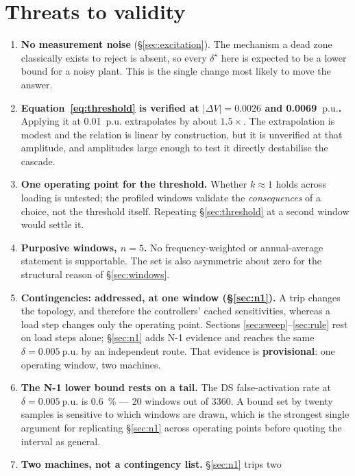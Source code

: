\documentclass[11pt,a4paper]{article}
\newcommand{\pu}{\ensuremath{\mathrm{p.u.}}}
\newcommand{\dz}{\ensuremath{\delta}}
\begin{document}
\section{Threats to validity}

\begin{enumerate}
  \item \textbf{No measurement noise} (\S\ref{sec:excitation}). The mechanism a
    dead zone classically exists to reject is absent, so every $\dz^\star$ here
    is expected to be a lower bound for a noisy plant. This is the single change
    most likely to move the answer.
  \item \textbf{Equation~\eqref{eq:threshold} is verified at
    $|\Delta V| = 0.0026$ and \SI{0.0069}{\pu}.} Applying it at
    \SI{0.01}{\pu} extrapolates by about $1.5\times$. The extrapolation is
    modest and the relation is linear by construction, but it is unverified at
    that amplitude, and amplitudes large enough to test it directly destabilise
    the cascade.
  \item \textbf{One operating point for the threshold.} Whether $k\approx1$
    holds across loading is untested; the profiled windows validate the
    \emph{consequences} of a choice, not the threshold itself. Repeating
    \S\ref{sec:threshold} at a second window would settle it.
  \item \textbf{Purposive windows, $n=5$.} No frequency-weighted or
    annual-average statement is supportable. The set is also asymmetric about
    zero for the structural reason of \S\ref{sec:windows}.
  \item \textbf{Contingencies: addressed, at one window
    (\S\ref{sec:n1}).} A trip changes the topology, and therefore the
    controllers' cached sensitivities, whereas a load step changes only the
    operating point. Sections \ref{sec:sweep}--\ref{sec:rule} rest on load
    steps alone; \S\ref{sec:n1} adds N-1 evidence and reaches the same
    $\dz=\SI{0.005}{\pu}$ by an independent route. That evidence is
    \textbf{provisional}: one operating window, two machines.
  \item \textbf{The N-1 lower bound rests on a tail.} The DS false-activation
    rate at $\dz=\SI{0.005}{\pu}$ is \SI{0.6}{\percent} --- 20 windows out of
    3360. A bound set by twenty samples is sensitive to which windows are drawn,
    which is the strongest single argument for replicating \S\ref{sec:n1} across
    operating points before quoting the interval as general.
  \item \textbf{Two machines, not a contingency list.} \S\ref{sec:n1} trips two

\end{enumerate}
\end{document}
